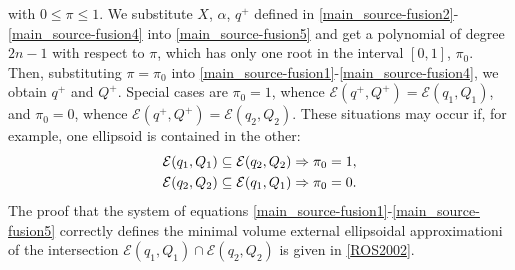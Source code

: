 \documentclass[letterpaper,10pt,english]{sphinxmanual}
\begin{document}
with $0\leqslant\pi\leqslant1$. We substitute $X$,
$\alpha$, $q^+$ defined in \eqref{main_source-fusion2}-\eqref{main_source-fusion4} into
\eqref{main_source-fusion5} and get a polynomial of degree $2n-1$ with respect to
$\pi$, which has only one root in the interval $[0,1]$,
$\pi_0$. Then, substituting $\pi=\pi_0$ into
\eqref{main_source-fusion1}-\eqref{main_source-fusion4}, we obtain $q^+$ and $Q^+$. Special
cases are $\pi_0=1$, whence
${\mathcal E}(q^+,Q^+)={\mathcal E}(q_1,Q_1)$, and
$\pi_0=0$, whence
${\mathcal E}(q^+,Q^+)={\mathcal E}(q_2,Q_2)$. These situations
may occur if, for example, one ellipsoid is contained in the other:
\begin{gather}
\begin{split}{\mathcal E}(q_1,Q_1)\subseteq{\mathcal E}(q_2,Q_2) & \Rightarrow \pi_0 = 1,\\
{\mathcal E}(q_2,Q_2)\subseteq{\mathcal E}(q_1,Q_1) & \Rightarrow \pi_0 = 0.\end{split}\notag
\end{gather}
The proof that the system of equations \eqref{main_source-fusion1}-\eqref{main_source-fusion5} correctly
defines the minimal volume external ellipsoidal approximationi of the
intersection ${\mathcal E}(q_1,Q_1)\cap{\mathcal E}(q_2,Q_2)$ is
given in {\hyperref[main_source:ros2002]{{[}ROS2002{]}}}.
\end{document}
